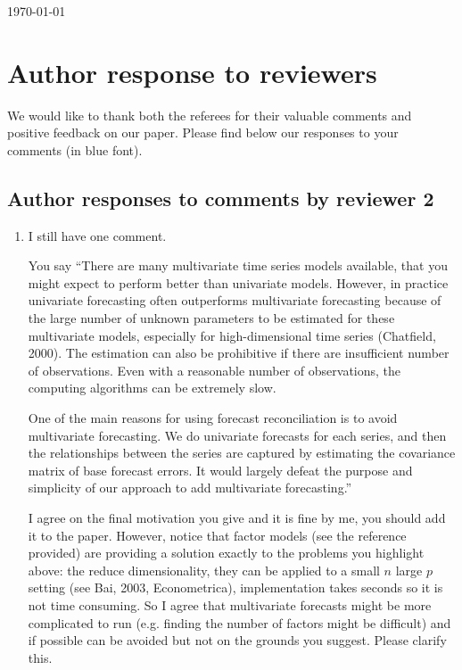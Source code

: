 \documentclass[10pt,a4paper]{article}
\begin{document}
\today

\section*{Author response to reviewers}

We would like to thank both the referees for their valuable comments and positive feedback on our paper.  Please find below our responses to your comments (in {\color{blue} blue} font).

\subsection*{Author responses to comments by reviewer 2}

\begin{enumerate}
\item
	I still have one comment. 

	You say ``There are many multivariate time series models available, that you might expect to perform better than univariate models. However, in practice univariate forecasting often outperforms multivariate forecasting because of the large number of unknown parameters to be estimated for these multivariate models, especially for high-dimensional time series (Chatfield, 2000). The estimation can also be prohibitive if there are insufficient number of observations. Even with a reasonable number of observations, the computing algorithms can be extremely slow.
	
	One of the main reasons for using forecast reconciliation is to avoid multivariate forecasting. We do univariate forecasts for each series, and then the relationships between the series are captured by estimating the covariance matrix of base forecast errors. It would largely defeat the purpose and simplicity of our approach to add multivariate forecasting.''

	I agree on the final motivation you give and it is fine by me, you should add it to the paper. However, notice that factor models (see the reference provided) are providing a solution exactly to the problems you highlight above: the reduce dimensionality, they can be applied to a small $n$ large $p$ setting (see Bai, 2003, Econometrica), implementation takes seconds so it is not time consuming. So I agree that multivariate forecasts might be more complicated to run (e.g. finding the number of factors might be difficult) and if possible can be avoided but not on the grounds you suggest. Please clarify this.
	

\end{enumerate}
\end{document}
